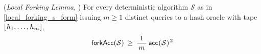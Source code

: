 \documentclass{iacrtrans}
\begin{document}
\begin{lem}\label{local_forking_lemma}
\textup{(\textit{Local Forking Lemma}, \cite{paper_bellare_local_forking})}
For every deterministic algorithm $\mathcal{S}$ as in
\eqref{local_forking_s_form} issuing $m \ge 1$ distinct queries
to a hash oracle with tape
$[\hspace{0.75pt}h_1, \dots, h_{m}\hspace{0.75pt}]$,
\vspace{5pt}
\begin{equation}\label{local_forking_bound}
\mathsf{forkAcc}
	(
		\mathcal{S}
	)
	\hspace{2pt}
	\ge
	\hspace{2pt}
	\frac{1}{\hspace{2pt}m\hspace{2pt}}
	\hspace{2pt}
	\mathsf{acc}
	\hspace{0.3pt}
	(
		\hspace{0.3pt}
		\mathcal{S}
		\hspace{0.3pt}
	) ^ {\hspace{1pt}2}
\vspace{5pt}
\end{equation}
\end{lem}
\end{document}
